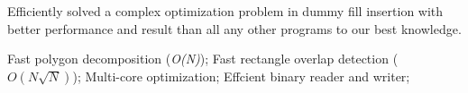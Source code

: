 \begin{cventry}
  \item Efficiently solved a complex optimization problem in dummy fill insertion with better performance and result than all any other programs to our best knowledge.
  \item Fast polygon decomposition (\textit{O(N)}); Fast rectangle overlap detection (\textit{$O(N\sqrt{N})$}); Multi-core optimization; Effcient binary reader and writer;
\end{cventry}
